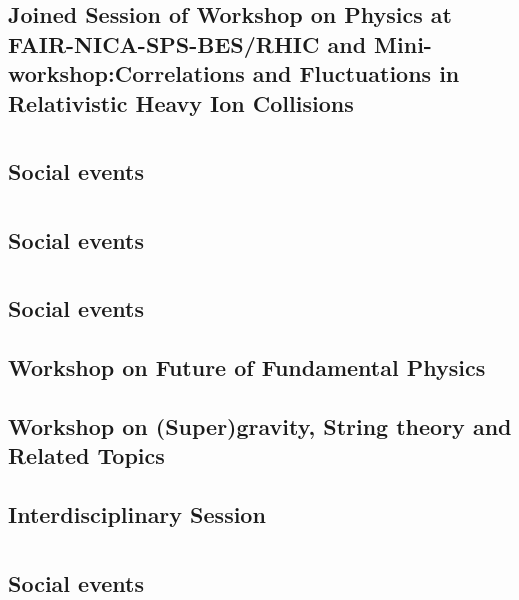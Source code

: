 \subsection{Joined Session of Workshop on Physics at FAIR-NICA-SPS-BES/RHIC and Mini-workshop:Correlations and Fluctuations in Relativistic Heavy Ion Collisions}

\clearpage

\section{}
\subsection{Social events}

\clearpage

\section{}
\subsection{Social events}

\clearpage

\section{}
\subsection{Social events}

\clearpage

\subsection{Workshop on Future of Fundamental Physics}

\clearpage

\subsection{Workshop on (Super)gravity, String theory and Related Topics}

\clearpage

\subsection{Interdisciplinary Session}

\clearpage

\section{}
\subsection{Social events}

\clearpage


